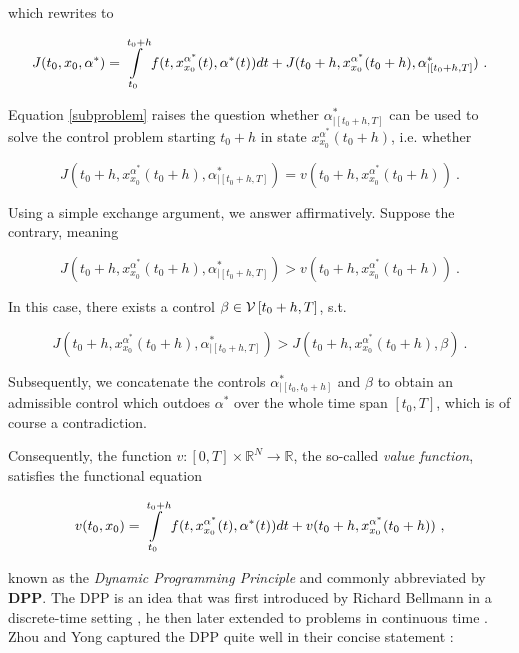 	which rewrites to
	
	\begin{equation}
		\label{subproblem}
		J(t_0, x_0, \alpha^{*}) = \pathint{\alpha^{*}}{t_0}{t_0 + h} + J(t_0 + h, x^{\alpha^{*}}_{x_0}(t_0 + h), \alpha^{*}_{|\left[t_0 + h, T\right]}) \ .
	\end{equation}
	
	Equation \eqref{subproblem} raises the question whether $ \alpha^{*}_{|\left[t_0 + h, T\right]} $ can be used to solve the control problem starting $ t_0 + h $ in state $ x^{\alpha^{*}}_{x_0}(t_0 + h) $, i.e. whether
	
	\begin{equation*}
		J(t_0 + h, x^{\alpha^{*}}_{x_0}(t_0 + h), \alpha^{*}_{|\left[t_0 + h, T\right]}) =  v(t_0 + h, x^{\alpha^{*}}_{x_0}(t_0 + h)) \ .
	\end{equation*}
	
	Using a simple exchange argument, we answer affirmatively. Suppose the contrary, meaning
	
	\begin{equation*}
		J(t_0 + h, x^{\alpha^{*}}_{x_0}(t_0 + h), \alpha^{*}_{|\left[t_0 + h, T\right]}) >  v(t_0 + h, x^{\alpha^{*}}_{x_0}(t_0 + h)) \ .
	\end{equation*}
	
	In this case, there exists a control $ \beta \in \mathcal{V}\left[ {t_0 + h}, T \right]$, s.t.
	
	\begin{equation*}
		J(t_0 + h, x^{\alpha^{*}}_{x_0}(t_0 + h), \alpha^{*}_{|\left[t_0 + h, T\right]}) > J(t_0 + h, x^{\alpha^{*}}_{x_0}(t_0 + h), \beta) \ .
	\end{equation*}
	
	Subsequently, we concatenate the controls $ \alpha^{*}_{\mid \left[t_0, t_0 + h \right]} $ and $ \beta $ to obtain an admissible control which outdoes $ \alpha^{*} $ over the whole time span $ \left[t_0, T \right] $, which is of course a contradiction.
	
	Consequently, the function $ v : \left[ 0, T \right] \times \mathbb{R}^N \to  \mathbb{R}$, the so-called \emph{value function}, satisfies the functional equation
	
	\begin{equation}
		\label{dpp}
		v(t_0, x_0) = \pathint{\alpha^{*}}{t_0}{t_0 + h} + v(t_0 + h, x^{\alpha^{*}}_{x_0}(t_0 + h)) \ ,
	\end{equation}
	
	known as the \emph{Dynamic Programming Principle} and commonly abbreviated by \textbf{DPP}. The DPP is an idea that was first introduced by Richard Bellmann in a discrete-time setting \cite{bellmandiscrete}, he then later extended to problems in continuous time \cite{bellmancontinuous}. Zhou and Yong captured the DPP quite well in their concise statement \cite[p. ~160]{zhou}: 
	

